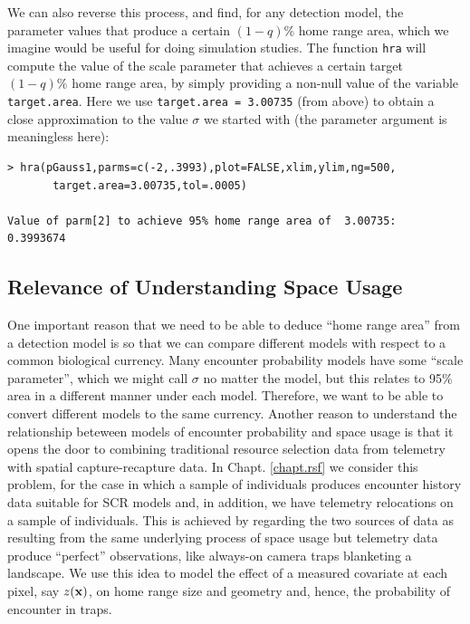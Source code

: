 We can also reverse this process, and find, for any detection model,
the parameter values that produce a certain $(1-q)$\% home range
area, which we imagine would be useful for doing simulation studies.
The function \mbox{\tt hra} will compute the value of the scale parameter 
that achieves a certain target $(1-q)\%$ home range area, by
simply providing a non-null value of the variable \mbox{\tt
  target.area}. Here we use \mbox{\tt target.area = 3.00735} (from
above) to obtain a close approximation to the value $\sigma$ we
started with (the parameter argument is meaningless here):
{\small
\begin{verbatim}
> hra(pGauss1,parms=c(-2,.3993),plot=FALSE,xlim,ylim,ng=500,
       target.area=3.00735,tol=.0005)

Value of parm[2] to achieve 95% home range area of  3.00735:  0.3993674
\end{verbatim}
}

\subsection{Relevance of Understanding Space Usage}

One important reason that we need to be able to deduce ``home range
area'' from a detection model is so that we can compare different
models with respect to a common biological currency. 
Many encounter probability models have some ``scale parameter'', which
we might call $\sigma$ no matter the model, but this 
relates to 95\% area in a different manner under each model. 
Therefore, we want to be able to convert different models to the
same currency. 
Another reason to understand the relationship beteween models of
encounter probability and space usage is that it opens the door to
combining traditional resource selection data from telemetry with
spatial capture-recapture data.  In Chapt. \ref{chapt.rsf} we consider
this problem, for the case in which a sample of individuals produces
encounter history data suitable for SCR models and, in addition, we
have telemetry relocations on a sample of individuals. This is
achieved by regarding the two sources of data as resulting from the
same underlying process of space usage but telemetry data produce
``perfect'' observations, like always-on camera traps blanketing a
landscape.  We use this idea to model the effect of a measured
covariate at each pixel, say $z({\bf x})$, on home range size and geometry
and, hence, the probability of encounter in traps. 


